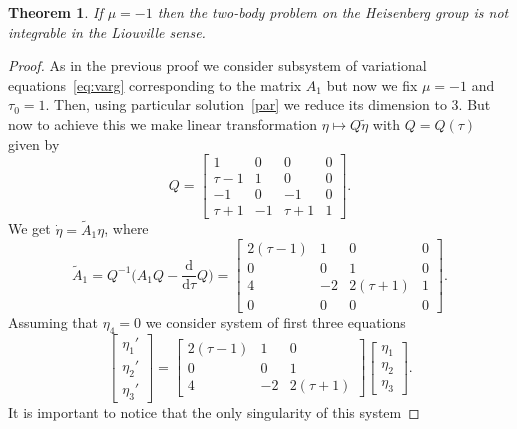 \documentclass[pdftex]{sigma}
\numberwithin{equation}{section}
\newtheorem{Theorem}{Theorem}[section]
\begin{document}
\begin{Theorem}%
 If $\mu=-1$ then the two-body problem on the Heisenberg group is not
 integrable in the Liouville sense.
\end{Theorem}
\begin{proof}
 As in the previous proof we consider subsystem of variational
 equations~\eqref{eq:varg} corresponding to the matrix $A_1$ but now
 we fix $\mu=-1$ and $\tau_0=1$. Then, using particular
 solution~\eqref{par} we reduce its dimension to 3. But now to achieve
 this we make linear transformation $\eta\mapsto Q\widetilde\eta$
 with $Q=Q(\tau)$ given by
 \begin{equation*}
 Q = \begin{bmatrix}
 1 & 0 & 0 & 0\\
 \tau-1 & 1 & 0 & 0\\
 -1 & 0 & -1 & 0\\
 \tau +1 & -1 & \tau+1 & 1
 \end{bmatrix}\!.
 \end{equation*}
 We get $\dot{\eta}=\widetilde{A}_1\eta$, where
 \begin{equation*}
 \widetilde{A}_1 =Q^{-1}\bigg(A_1 Q -
 \frac{\mathrm{d}}{\mathrm{d}\tau}Q\bigg) =
 \begin{bmatrix}
 2(\tau -1) & 1 & 0 & 0\\
 0 & 0 & 1 & 0\\
 4 & -2 & 2(\tau+1) & 1\\
 0 & 0 & 0 & 0
 \end{bmatrix}\!.
 \end{equation*}
 Assuming that $\eta_4=0$ we consider system of first three equations
 \begin{equation}
 \label{s3}
 \begin{bmatrix}
 \eta_1'\\
 \eta_2'\\
 \eta_3'
 \end{bmatrix}=\begin{bmatrix}
 2(\tau -1) & 1 & 0 \\
 0 & 0 & 1 \\
 4 & -2 & 2(\tau+1)
 \end{bmatrix} \begin{bmatrix}
 \eta_1\\
 \eta_2\\
 \eta_3
 \end{bmatrix}\!.
 \end{equation}
 It is important to notice that the only singularity of this system

\end{proof}
\end{document}
